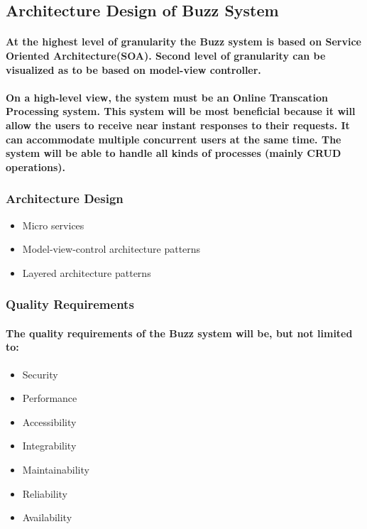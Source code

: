 \documentclass[12pt]{article}
\begin{document}
\subsection{Architecture Design of Buzz System}
\paragraph{At the highest level of granularity the Buzz system is based on Service Oriented Architecture(SOA). Second level of granularity can be visualized as to be based on model-view controller.}
\paragraph{On a high-level view, the system must be an Online Transcation Processing system. This system will be most beneficial because it will allow the users to receive near instant responses to their requests. It can accommodate multiple concurrent users at the same time. The system will be able to handle all kinds of processes (mainly CRUD operations).}

\newpage
\subsubsection*{Architecture Design}
\begin{itemize}
\item Micro services
\item Model-view-control architecture patterns
\item Layered architecture patterns
\end{itemize}
\subsubsection*{Quality Requirements}
\paragraph*{The quality requirements of the Buzz system will be, but not limited to:}
\begin{itemize}
\item Security
\item Performance
\item Accessibility
\item Integrability
\item Maintainability
\item Reliability
\item Availability
\end{itemize}
\end{document}
